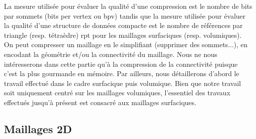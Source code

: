 La mesure utilisée pour évaluer la qualité d'une compression est le nombre de bits par sommets (bits per vertex ou bpv) tandis que la mesure utilisée pour évaluer la qualité d'une structure de données compacte est le nombre de références par triangle (resp. tétraèdre) rpt pour les maillages surfaciques (resp. volumiques).\\
On peut compresser un maillage en le simplifiant (supprimer des sommets...), en encodant la géométrie et/ou la connectivité du maillage. Nous ne nous intéresserons dans cette partie qu'à la compression de la connectivité puisque c'est la plus gourmande en mémoire. Par ailleurs, nous détaillerons d'abord le travail effectué dans le cadre surfacique puis volumique. Bien que notre travail soit uniquement centré sur les maillages volumiques, l'essentiel des travaux effectués jusqu'à présent est consacré aux maillages surfaciques.
\subsection{Maillages 2D}
